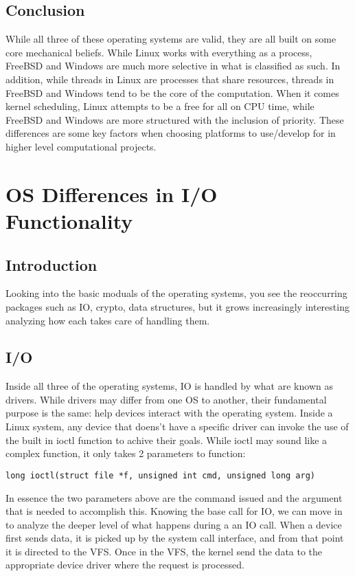 \documentclass[draftclsnofoot, onecolumn] {report}
\begin{document}
\section{Conclusion}
While all three of these operating systems are valid, they are all built on some core mechanical beliefs.
While Linux works with everything as a process, FreeBSD and Windows are much more selective in what is classified as such. 
In addition, while threads in Linux are processes that share resources, threads in FreeBSD and Windows tend to be the core of the computation.
When it comes kernel scheduling, Linux attempts to be a free for all on CPU time, while FreeBSD and Windows are more structured with the inclusion of priority. 
These differences are some key factors when choosing platforms to use/develop for in higher level computational projects. 

\chapter{OS Differences in I/O Functionality}

\section{Introduction}
Looking into the basic moduals of the operating systems, you see the reoccurring packages such as IO, crypto, data structures, but it grows increasingly interesting analyzing how each takes care of handling them. 

\section{I/O}
Inside all three of the operating systems, IO is handled by what are known as drivers. 
While drivers may differ from one OS to another, their fundamental purpose is the same: help devices interact with the operating system.  
Inside a Linux system, any device that doens't have a specific driver can invoke the use of the built in ioctl function to achive their goals. 
While ioctl may sound like a complex function, it only takes 2 parameters to function:
\begin{verbatim}
long ioctl(struct file *f, unsigned int cmd, unsigned long arg)
\end{verbatim}
In essence the two parameters above are the command issued and the argument that is needed to accomplish this. 
Knowing the base call for IO, we can move in to analyze the deeper level of what happens during a an IO call. 
When a device first sends data, it is picked up by the system call interface, and from that point it is directed to the VFS.
Once in the VFS, the kernel send the data to the appropriate device driver where the request is processed. 
\end{document}

